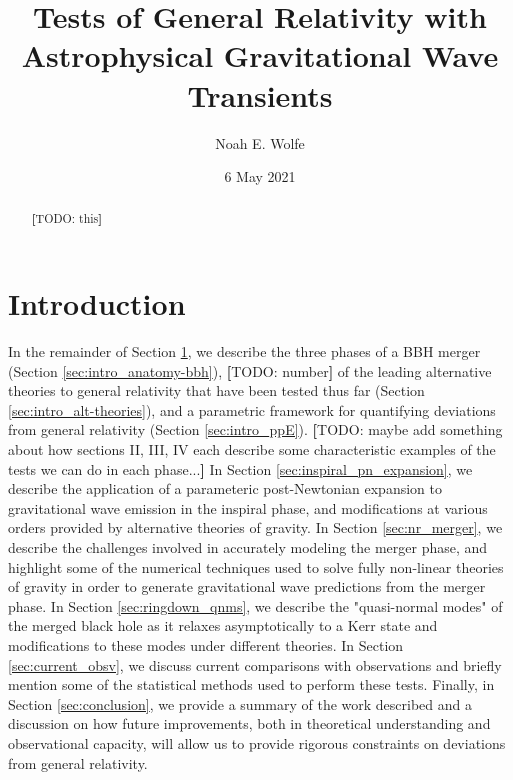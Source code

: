 \documentclass[aps,prd,twocolumn,floatfix,preprintnumbers,altaffilletter,superscriptaddress]{revtex4-1}
\newcommand{\TODO}[1]{\textbf{[}{\color{red}TODO: }{\color{blue}#1}\textbf{]}}
\begin{document}
\title{Tests of General Relativity with Astrophysical Gravitational Wave Transients}
\author{Noah E. Wolfe}
\date{6 May 2021}

\begin{abstract}
    \TODO{this}
\end{abstract}

\maketitle

\section{Introduction} \label{sec:intro}




In the remainder of Section \ref{sec:intro}, we describe the three phases of a BBH merger (Section \ref{sec:intro_anatomy-bbh}), \TODO{number} of the leading alternative theories to general relativity that have been tested thus far (Section \ref{sec:intro_alt-theories}), and a parametric framework for quantifying deviations from general relativity (Section \ref{sec:intro_ppE}). \TODO{maybe add something about how sections II, III, IV each describe some characteristic examples of the tests we can do in each phase...} In Section \ref{sec:inspiral_pn_expansion}, we describe the application of a parameteric post-Newtonian expansion to gravitational wave emission in the inspiral phase, and modifications at various orders provided by alternative theories of gravity. In Section \ref{sec:nr_merger}, we describe the challenges involved in accurately modeling the merger phase, and highlight some of the numerical techniques used to solve fully non-linear theories of gravity in order to generate gravitational wave predictions from the merger phase. In Section \ref{sec:ringdown_qnms}, we describe the "quasi-normal modes" of the merged black hole as it relaxes asymptotically to a Kerr state and modifications to these modes under different theories. In Section \ref{sec:current_obsv}, we discuss current comparisons with observations and briefly mention some of the statistical methods used to perform these tests. Finally, in Section \ref{sec:conclusion}, we provide a summary of the work described and a discussion on how future improvements, both in theoretical understanding and observational capacity, will allow us to provide rigorous constraints on deviations from general relativity.
\end{document}
